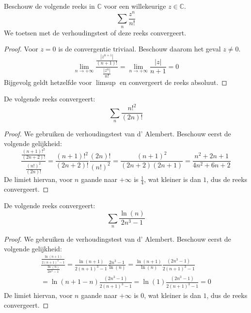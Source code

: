 \documentclass[main.tex]{subfiles}
\begin{document}
\begin{vb}
  Beschouw de volgende reeks in $\mathbb{C}$ voor een willekeurige $z\in \mathbb{C}$.
  \[ \sum_{n}\frac{z^{n}}{n!} \]
  We toetsen met de verhoudingstest of deze reeks convergeert.

  \begin{proof}
    Voor $z=0$ is de convergentie triviaal.
    Beschouw daarom het geval $z \neq 0$.
    \[ \lim_{n\rightarrow +\infty}\frac{\frac{|z^{n+1}|}{(n+1)!}}{\frac{|z^{n}|}{n!}} = \lim_{n \rightarrow +\infty }\frac{|z|}{n+1} = 0 \]
    Bijgevolg geldt hetzelfde voor $\limsup$  en convergeert de reeks absoluut.
  \end{proof}
\end{vb}

\begin{vb}
  De volgende reeks convergeert:
  \[ \sum_{n}\frac{n!^{2}}{(2n)!} \]

  \begin{proof}
    We gebruiken de verhoudingstest van d' Alembert.
    Beschouw eerst de volgende gelijkheid:
    \[
    \frac{\frac{(n+1)!^{2}}{(2n+2)!}}{\frac{(n!)^{2}}{(2n)!}}
    = \frac{(n+1)!^{2}}{(2n+2)!}\frac{(2n)!}{(n!)^{2}}
    = \frac{(n+1)^{2}}{(2n+2)(2n+1)}
    = \frac{n^{2}+2n+1}{4n^{2}+6n+2}
    \]
    De limiet hiervan, voor $n$ gaande naar $+\infty$ is $\frac{1}{4}$, wat kleiner is dan $1$, dus de reeks convergeert.
  \end{proof}
\end{vb}

\begin{vb}
  De volgende reeks convergeert:
  \[ \sum_{n}\frac{\ln(n)}{2n^{3}-1} \]

  \begin{proof}
    We gebruiken de verhoudingstest van d' Alembert.
    Beschouw eerst de volgende gelijkheid:
    \begin{align*}
      \frac{\frac{\ln(n+1)}{2(n+1)^{3}-1}}{\frac{\ln(n)}{2n^{3}-1}}
      = \frac{\ln(n+1)}{2(n+1)^{3}-1}\frac{2n^{3}-1}{\ln(n)}
      = \frac{\ln(n+1)}{\ln(n)} \frac{\left(2n^{3}-1\right)}{2(n+1)^{3}-1}\\
      = \ln(n+1-n)  \frac{\left(2n^{3}-1\right)}{2(n+1)^{3}-1}
      = \ln(1)  \frac{\left(2n^{3}-1\right)}{2(n+1)^{3}-1}
      = 0
    \end{align*}
    De limiet hiervan, voor $n$ gaande naar $+\infty$ is $0$, wat kleiner is dan $1$, dus de reeks convergeert.
  \end{proof}
\end{vb}
\end{document}
